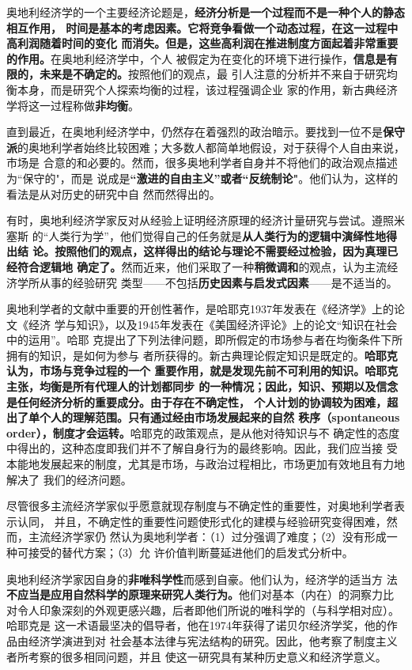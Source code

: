 奥地利经济学的一个主要经济论题是，\textbf{经济分析是一个过程而不是一种个人的静态相互作用，
时间是基本的考虑因素。它将竞争看做一个动态过程，在这一过程中高利润随着时间的变化
而消失。但是，这些高利润在推进制度方面起着非常重要的作用。}在奥地利经济学中，个人
被假定为在变化的环境下进行操作，\textbf{信息是有限的，未来是不确定的。}按照他们的观点，最
引人注意的分析并不来自于研究均衡本身，而是研究个人探索均衡的过程，该过程强调企业
家的作用，新古典经济学将这一过程称做\textbf{非均衡}。

直到最近，在奥地利经济学中，仍然存在着强烈的政治暗示。要找到一位不是\textbf{保守
  派}的奥地利学者始终比较困难；大多数人都简单地假设，对于获得个人自由来说，市场是
合意的和必要的。然而，很多奥地利学者自身并不将他们的政治观点描述为“保守的"，而是
说成是\textbf{“激进的自由主义”或者“反统制论"}。他们认为，这样的看法是从对历史的研究中自
然而然得出的。

有时，奥地利经济学家反对从经验上证明经济原理的经济计量研究与尝试。遵照米塞斯
的“人类行为学”，他们觉得自己的任务就是\textbf{从人类行为的逻辑中演绎性地得出结
  论。按照他们的观点，这样得出的结论与理论不需要经过检验，因为真理已经符合逻辑地
  确定了。}然而近来，他们采取了一种\textbf{稍微调和}的观点，认为主流经济学所从事的经验研究
类型——不包括\textbf{历史因素与启发式因素}——是不适当的。

奥地利学者的文献中重要的开创性著作，是哈耶克1937年发表在《经济学》上的论文《经济
学与知识》，以及1945年发表在《美国经济评论》上的论文“知识在社会中的运用”。哈耶
克提出了下列法律问题，即所假定的市场参与者在均衡条件下所拥有的知识，是如何为参与
者所获得的。新古典理论假定知识是既定的。\textbf{哈耶克认为，市场与竞争过程的一个
  重要作用，就是发现先前不可利用的知识。哈耶克主张，均衡是所有代理人的计划都同步
  的一种情况；因此，知识、预期以及信念是任何经济分析的重要成分。由于存在不确定性，
  个人计划的协调较为困难，超出了单个人的理解范围。只有通过经由市场发展起来的自然
  秩序（spontaneous order），制度才会运转。}哈耶克的政策观点，是从他对待知识与不
确定性的态度中得出的，这种态度即我们并不了解自身行为的最终影响。因此，我们应当接
受本能地发展起来的制度，尤其是市场，与政治过程相比，市场更加有效地且有力地解决了
我们的经济问题。

尽管很多主流经济学家似乎愿意就现存制度与不确定性的重要性，对奥地利学者表示认同，
并且，不确定性的重要性问题使形式化的建模与经验研究变得困难，然而，主流经济学家仍
然认为奥地利学者：（1）过分强调了难度；（2）没有形成一种可接受的替代方案；（3）允
许价值判断蔓延进他们的启发式分析中。

奥地利经济学家因自身的\textbf{非唯科学性}而感到自豪。他们认为，经济学的适当方
法\textbf{不应当是应用自然科学的原理来研究人类行为。}他们对基本（内在）的洞察力比
对令人印象深刻的外观更感兴趣，后者即他们所说的唯科学的（与科学相对应）。哈耶克是
这一术语最坚决的倡导者，他在1974年获得了诺贝尔经济学奖，他的作品由经济学演进到对
社会基本法律与宪法结构的研究。因此，他考察了制度主义者所考察的很多相同问题，并且
使这一研究具有某种历史意义和经济学意义。

